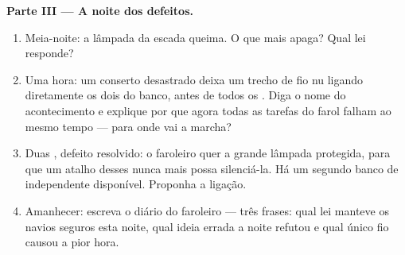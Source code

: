 \begin{problem}
\medskip\noindent\textbf{Parte III --- A noite dos defeitos.}
\begin{enumerate}[resume]
  \item Meia-noite: a lâmpada da escada queima. O que mais apaga?
        Qual lei responde?
  \item Uma hora: um conserto desastrado deixa um trecho de fio nu
        ligando diretamente os dois  do banco, antes de
        todos os . Diga o nome do acontecimento e explique por
        que agora todas as tarefas do farol falham ao mesmo tempo ---
        para onde vai a marcha?
  \item Duas , defeito resolvido: o faroleiro quer a grande
        lâmpada protegida, para que um atalho desses nunca mais possa
        silenciá-la. Há um segundo banco de  independente
        disponível. Proponha a ligação.
  \item Amanhecer: escreva o diário do faroleiro --- três frases:
        qual lei manteve os navios seguros esta noite, qual ideia
        errada a noite refutou e qual único fio causou a pior hora.
\end{enumerate}
\end{problem}
